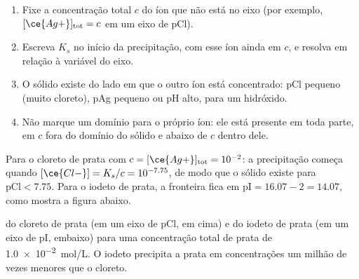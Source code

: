\begin{method}\label{met:b1:precipitation:existence-domain}
\begin{enumerate}
  \item Fixe a concentração total $c$ do íon que não está no eixo (por
        exemplo, $[\ce{Ag+}]_{\mathrm{tot}} = c$ em um eixo de pCl).
  \item Escreva $K_s$ no início da precipitação, com esse íon ainda em
        $c$, e resolva em relação à variável do eixo.
  \item O sólido existe do lado em que o outro íon está concentrado: pCl
        pequeno (muito cloreto), pAg pequeno ou pH alto, para um
        hidróxido.
  \item Não marque um domínio para o próprio íon: ele está presente em
        toda parte, em $c$ fora do domínio do sólido e abaixo de $c$
        dentro dele.
\end{enumerate}
\end{method}

Para o cloreto de prata com $c = [\ce{Ag+}]_{\mathrm{tot}} = 10^{-2}$:
a precipitação começa quando $[\ce{Cl-}] = K_s/c = 10^{-7.75}$, de modo
que o sólido existe para $\mathrm{pCl} < 7.75$. Para o iodeto de prata,
a fronteira fica em $\mathrm{pI} = 16.07 - 2 = 14.07$, como mostra a
figura abaixo.

\begin{omfigure}

{\small {} do cloreto de prata (em um eixo de pCl,
em cima) e do iodeto de prata (em um eixo de pI, embaixo) para uma
concentração total de prata de \qty{1.0e-2}{mol/L}. O iodeto precipita a
prata em concentrações um milhão de vezes menores que o cloreto.}
\end{omfigure}


